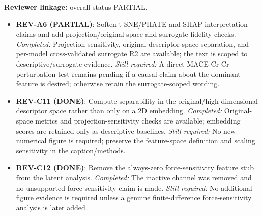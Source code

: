 \textbf{Reviewer linkage:} overall status PARTIAL.
\begin{itemize}[leftmargin=1.4em,noitemsep]
\item \textbf{REV-A6 (PARTIAL)}: Soften t-SNE/PHATE and SHAP interpretation claims and add projection/original-space and surrogate-fidelity checks. \emph{Completed:} Projection sensitivity, original-descriptor-space separation, and per-model cross-validated surrogate R2 are available; the text is scoped to descriptive/surrogate evidence. \emph{Still required:} A direct MACE Cr-Cr perturbation test remains pending if a causal claim about the dominant feature is desired; otherwise retain the surrogate-scoped wording.
\item \textbf{REV-C11 (DONE)}: Compute separability in the original/high-dimensional descriptor space rather than only on a 2D embedding. \emph{Completed:} Original-space metrics and projection-sensitivity checks are available; embedding scores are retained only as descriptive baselines. \emph{Still required:} No new numerical figure is required; preserve the feature-space definition and scaling sensitivity in the caption/methods.
\item \textbf{REV-C12 (DONE)}: Remove the always-zero force-sensitivity feature stub from the latent analysis. \emph{Completed:} The inactive channel was removed and no unsupported force-sensitivity claim is made. \emph{Still required:} No additional figure evidence is required unless a genuine finite-difference force-sensitivity analysis is later added.
\end{itemize}
